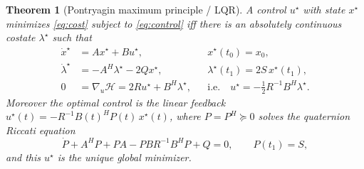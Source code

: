 \documentclass{amsart}
\newtheorem{theorem}{Theorem}
\theoremstyle{definition}
\begin{document}
\begin{theorem}[Pontryagin maximum principle / LQR]
\label{thm:pmp}
A control $u^\star$ with state $x^\star$ minimizes \eqref{eq:cost}
subject to \eqref{eq:control} iff there is an absolutely continuous
costate $\lambda^\star$ such that
\begin{align}
\dot x^\star&=A x^\star+B u^\star,&& x^\star(t_0)=x_0,\label{eq:state}\\
\dot\lambda^\star&=-A^H\lambda^\star-2Qx^\star,&&
\lambda^\star(t_1)=2S\,x^\star(t_1),\label{eq:costate}\\
0&=\nabla_u\mathcal H=2Ru^\star+B^H\lambda^\star,&&\text{i.e.}\quad
u^\star=-\tfrac12 R^{-1}B^H\lambda^\star.\label{eq:opt}
\end{align}
Moreover the optimal control is the linear feedback
$u^\star(t)=-R^{-1}B(t)^H P(t)\,x^\star(t)$, where
$P=P^H\succeq0$ solves the quaternion Riccati equation
\begin{equation}\label{eq:riccati}
\dot P+A^HP+PA-PBR^{-1}B^HP+Q=0,\qquad P(t_1)=S,
\end{equation}
and this $u^\star$ is the unique global minimizer.
\end{theorem}
\end{document}
